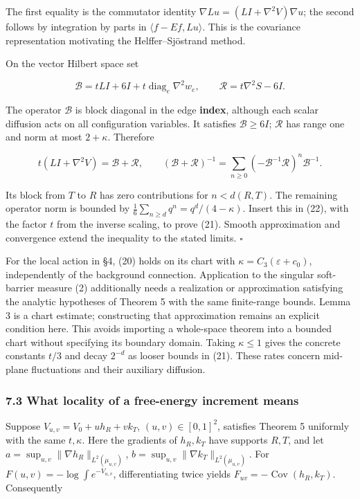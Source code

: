 \documentclass[11pt,a4paper]{article}
\begin{document}
The first equality is the commutator identity
\(\nabla Lu=(LI+\nabla^2V)\nabla u\); the second follows by integration
by parts in \(\langle f-Ef,Lu\rangle\). This is the covariance
representation motivating the Helffer--Sjöstrand method.

On the vector Hilbert space set

\[\mathcal B=tLI+6I+t\operatorname{diag}_e\nabla^2w_e,
\qquad \mathcal R=t\nabla^2S-6I.\]

The operator \(\mathcal B\) is block diagonal in the edge
\textbf{index}, although each scalar diffusion acts on all configuration
variables. It satisfies \(\mathcal B\ge6I\); \(\mathcal R\) has range
one and norm at most \(2+\kappa\). Therefore

\[t(LI+\nabla^2V)=\mathcal B+\mathcal R,
\qquad
(\mathcal B+\mathcal R)^{-1}
=\sum_{n\ge0}(-\mathcal B^{-1}\mathcal R)^n\mathcal B^{-1}.\]

Its block from \(T\) to \(R\) has zero contributions for \(n<d(R,T)\).
The remaining operator norm is bounded by
\(\frac16\sum_{n\ge d}q^n=q^d/(4-\kappa)\). Insert this in (22), with
the factor \(t\) from the inverse scaling, to prove (21). Smooth
approximation and convergence extend the inequality to the stated
limits. \(\square\)

For the local action in §4, (20) holds on its chart with
\(\kappa=C_3(\varepsilon+c_0)\), independently of the background
connection. Application to the singular soft-barrier measure (2)
additionally needs a realization or approximation satisfying the
analytic hypotheses of Theorem 5 with the same finite-range bounds.
Lemma 3 is a chart estimate; constructing that approximation remains an
explicit condition here. This avoids importing a whole-space theorem
into a bounded chart without specifying its boundary domain. Taking
\(\kappa\le1\) gives the concrete constants \(t/3\) and decay \(2^{-d}\)
as looser bounds in (21). These rates concern mid-plane fluctuations and
their auxiliary diffusion.

\hypertarget{what-locality-of-a-free-energy-increment-means}{%
\subsubsection{7.3 What locality of a free-energy increment
means}\label{what-locality-of-a-free-energy-increment-means}}

Suppose \(V_{u,v}=V_0+u h_R+v k_T\), \((u,v)\in[0,1]^2\), satisfies
Theorem 5 uniformly with the same \(t,\kappa\). Here the gradients of
\(h_R,k_T\) have supports \(R,T\), and let
\(a=\sup_{u,v}\|\nabla h_R\|_{L^2(\mu_{u,v})}\),
\(b=\sup_{u,v}\|\nabla k_T\|_{L^2(\mu_{u,v})}\). For
\(F(u,v)=-\log\int e^{-V_{u,v}}\), differentiating twice yields
\(F_{uv}=-\operatorname{Cov}(h_R,k_T)\). Consequently
\end{document}
